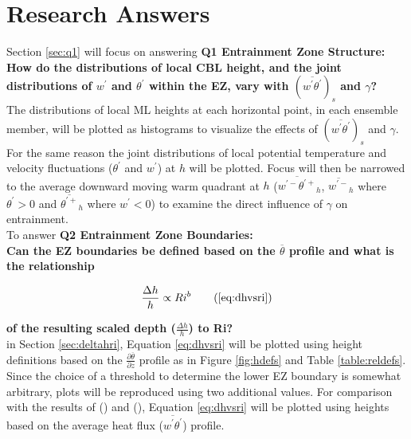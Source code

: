 
\chapter{Research Answers}
\label{ch:results}
\setlength{\parindent}{0cm}

Section \ref{sec:q1} will focus on answering \textbf{Q1 Entrainment Zone Structure:} \\ 

\textbf{How do the distributions of local \acs{CBL} height, and the joint distributions of $w^{'}$ and $\theta^{'}$ within the \acs{EZ}, vary with $(\overline{w^{'}\theta^{'}})_{s}$ and $\gamma$?}\\

The distributions of local \acs{ML} heights at each horizontal point, in each ensemble member, will be plotted as histograms to visualize the effects of $(\overline{w^{'}\theta^{'}})_{s}$ and $\gamma$.  For the same reason the joint distributions of local potential temperature and velocity fluctuations ($\theta^{'}$ and $w^{'}$) at $h$ will be plotted.  Focus will then be narrowed to the average downward moving warm quadrant at $h$ ($\overline{w^{'-}\theta^{'+}}_{h}$, $\overline{w^{'-}}_{h}$  where $ \theta^{'} >0$ and $\overline{\theta^{'+}}_{h} $ where $ w^{'} < 0 $) to examine the direct influence of $\gamma$ on entrainment.\\       

To answer \textbf{Q2 Entrainment Zone Boundaries:}\\ 

\textbf{Can the \acs{EZ} boundaries be defined based on the $\overline{\theta}$ profile and what is the relationship} 

\begin{equation}
\frac{\Delta h}{h} \propto Ri^{b}\tag{\ref{eq:dhvsri}}
\end{equation}

\textbf{of the resulting scaled depth ($\frac{\Delta h}{h}$) to \acs{Ri}?}\\

in Section \ref{sec:deltahri}, Equation \ref{eq:dhvsri} will be plotted using height definitions based on the $\frac{\partial \overline{\theta}}{\partial z}$ profile as in Figure \ref{fig:hdefs} and Table \ref{table:reldefs}.  Since the choice of a threshold to determine the lower \acs{EZ} boundary is somewhat arbitrary, plots will be reproduced using two additional values. For comparison with the results of \citeauthor{FedConzMir04} (\citeyear{FedConzMir04}) and \citeauthor{BrooksFowler2} (\citeyear{BrooksFowler2}), Equation \ref{eq:dhvsri} will be plotted using heights based on the average heat flux ($\overline{w^{'}\theta^{'}}$) profile.\\   

